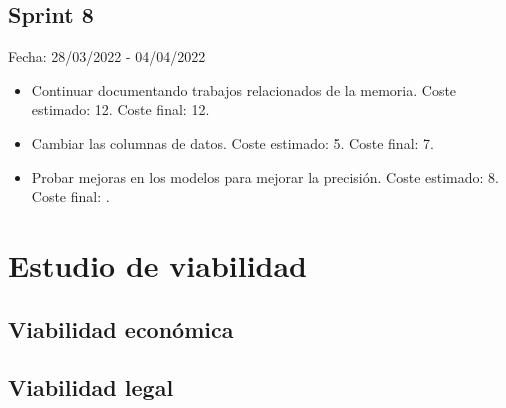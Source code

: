\subsection{Sprint 8}
Fecha: 28/03/2022 - 04/04/2022
\begin{itemize}
	\item Continuar documentando trabajos relacionados de la memoria. Coste estimado: 12. Coste final: 12.
	\item Cambiar las columnas de datos. Coste estimado: 5. Coste final: 7.
	\item Probar mejoras en los modelos para mejorar la precisión. Coste estimado: 8. Coste final: .
\end{itemize}

\section{Estudio de viabilidad}

\subsection{Viabilidad económica}

\subsection{Viabilidad legal}
